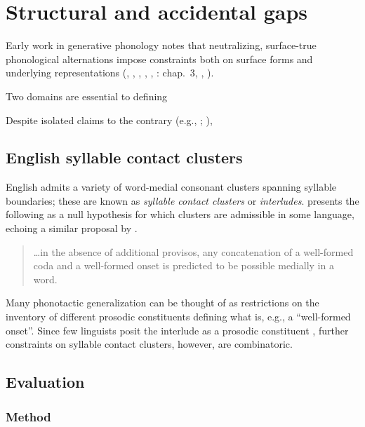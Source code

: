 \chapter{Structural and accidental gaps} 
\label{gaps}

Early work in generative phonology notes that neutralizing, surface-true phonological alternations impose constraints both on surface forms and underlying representations (\citealp[283]{Anderson1974}, \citealp[382]{SPE}, \citealp[205f.]{Dell1973}, \citealp[22f.]{SPR}, \citealp{Kisseberth1970b}, \citealp{Kenstowicz1977}: chap.~3, \citealp[28f.]{Stampe1973}, \citealp[410f.]{Stanley1967}). 

Two domains are essential to defining 

Despite isolated claims to the contrary (e.g., \citealp[297]{Hale1965}; \citealp[212f.]{Postal1968}), 


\section{English syllable contact clusters}

English admits a variety of word-medial consonant clusters spanning syllable boundaries; these are known as \emph{syllable contact clusters} or \emph{interludes}. \citeauthor{Pierrehumbert1994} presents the following as a null hypothesis for which clusters are admissible in some language, echoing a similar proposal by \citet{Haugen1956}.

\begin{quote}
\ldots{}in the absence of additional provisos, any concatenation of a well-formed coda and a well-formed onset is predicted to be possible medially in a word. \citep[][168]{Pierrehumbert1994}
\end{quote}

Many phonotactic generalization can be thought of as restrictions on the inventory of different prosodic constituents defining what is, e.g., a ``well-formed onset''. Since few linguists posit the interlude as a prosodic constituent \citep[though cf.][]{Steriade1999}, further constraints on syllable contact clusters, however, are combinatoric.

\section{Evaluation}
\label{4evaluation}

\subsection{Method}

